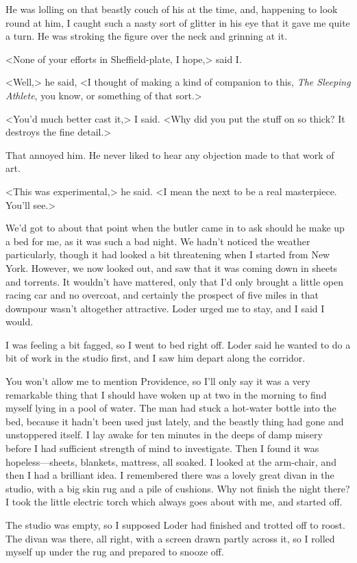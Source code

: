 He was lolling on that beastly couch of his at the time, and, happening to look round at him, I caught such a nasty sort of glitter in his eye that it gave me quite a turn. He was stroking the figure over the neck and grinning at it.

<None of your efforts in Sheffield-plate, I hope,> said I\@.

<Well,> he said, <I thought of making a kind of companion to this, \textit{The Sleeping Athlete}, you know, or something of that sort.>

<You'd much better cast it,> I said. <Why did you put the stuff on so thick? It destroys the fine detail.>

That annoyed him. He never liked to hear any objection made to that work of art.

<This was experimental,> he said. <I mean the next to be a real masterpiece. You'll see.>

We'd got to about that point when the butler came in to ask should he make up a bed for me, as it was such a bad night. We hadn't noticed the weather particularly, though it had looked a bit threatening when I started from New York. However, we now looked out, and saw that it was coming down in sheets and torrents. It wouldn't have mattered, only that I'd only brought a little open racing car and no overcoat, and certainly the prospect of five miles in that downpour wasn't altogether attractive. Loder urged me to stay, and I said I would.

I was feeling a bit fagged, so I went to bed right off. Loder said he wanted to do a bit of work in the studio first, and I saw him depart along the corridor.

You won't allow me to mention Providence, so I'll only say it was a very remarkable thing that I should have woken up at two in the morning to find myself lying in a pool of water. The man had stuck a hot-water bottle into the bed, because it hadn't been used just lately, and the beastly thing had gone and unstoppered itself. I lay awake for ten minutes in the deeps of damp misery before I had sufficient strength of mind to investigate. Then I found it was hopeless—sheets, blankets, mattress, all soaked. I looked at the arm-chair, and then I had a brilliant idea. I remembered there was a lovely great divan in the studio, with a big skin rug and a pile of cushions. Why not finish the night there? I took the little electric torch which always goes about with me, and started off.

The studio was empty, so I supposed Loder had finished and trotted off to roost. The divan was there, all right, with a screen drawn partly across it, so I rolled myself up under the rug and prepared to snooze off.

